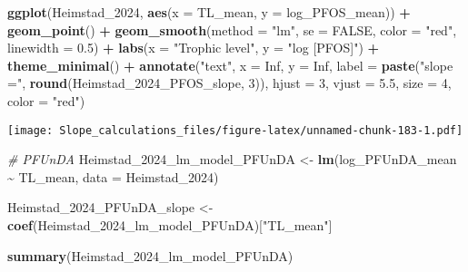 \documentclass[
]{article}
\newenvironment{Shaded}{\begin{snugshade}}{\end{snugshade}}
\newcommand{\AttributeTok}[1]{\textcolor[rgb]{0.13,0.29,0.53}{#1}}
\newcommand{\CommentTok}[1]{\textcolor[rgb]{0.56,0.35,0.01}{\textit{#1}}}
\newcommand{\ConstantTok}[1]{\textcolor[rgb]{0.56,0.35,0.01}{#1}}
\newcommand{\DecValTok}[1]{\textcolor[rgb]{0.00,0.00,0.81}{#1}}
\newcommand{\FloatTok}[1]{\textcolor[rgb]{0.00,0.00,0.81}{#1}}
\newcommand{\FunctionTok}[1]{\textcolor[rgb]{0.13,0.29,0.53}{\textbf{#1}}}
\newcommand{\NormalTok}[1]{#1}
\newcommand{\OtherTok}[1]{\textcolor[rgb]{0.56,0.35,0.01}{#1}}
\newcommand{\SpecialCharTok}[1]{\textcolor[rgb]{0.81,0.36,0.00}{\textbf{#1}}}
\newcommand{\StringTok}[1]{\textcolor[rgb]{0.31,0.60,0.02}{#1}}
\begin{document}
\begin{Shaded}
\begin{Highlighting}[]
\FunctionTok{ggplot}\NormalTok{(Heimstad\_2024, }\FunctionTok{aes}\NormalTok{(}\AttributeTok{x =}\NormalTok{ TL\_mean, }\AttributeTok{y =}\NormalTok{ log\_PFOS\_mean)) }\SpecialCharTok{+}
  \FunctionTok{geom\_point}\NormalTok{() }\SpecialCharTok{+}
  \FunctionTok{geom\_smooth}\NormalTok{(}\AttributeTok{method =} \StringTok{"lm"}\NormalTok{, }\AttributeTok{se =} \ConstantTok{FALSE}\NormalTok{, }\AttributeTok{color =} \StringTok{"red"}\NormalTok{, }\AttributeTok{linewidth =} \FloatTok{0.5}\NormalTok{) }\SpecialCharTok{+}
  \FunctionTok{labs}\NormalTok{(}\AttributeTok{x =} \StringTok{"Trophic level"}\NormalTok{,}
       \AttributeTok{y =} \StringTok{"log [PFOS]"}\NormalTok{) }\SpecialCharTok{+}
  \FunctionTok{theme\_minimal}\NormalTok{() }\SpecialCharTok{+}
  \FunctionTok{annotate}\NormalTok{(}\StringTok{"text"}\NormalTok{, }\AttributeTok{x =} \ConstantTok{Inf}\NormalTok{, }\AttributeTok{y =} \ConstantTok{Inf}\NormalTok{, }\AttributeTok{label =} \FunctionTok{paste}\NormalTok{(}\StringTok{"slope ="}\NormalTok{, }\FunctionTok{round}\NormalTok{(Heimstad\_2024\_PFOS\_slope, }\DecValTok{3}\NormalTok{)), }
           \AttributeTok{hjust =} \DecValTok{3}\NormalTok{, }\AttributeTok{vjust =} \FloatTok{5.5}\NormalTok{, }\AttributeTok{size =} \DecValTok{4}\NormalTok{, }\AttributeTok{color =} \StringTok{"red"}\NormalTok{)}
\end{Highlighting}
\end{Shaded}

\texttt{[image: Slope\_calculations\_files/figure-latex/unnamed-chunk-183-1.pdf]}

\begin{Shaded}
\begin{Highlighting}[]
\CommentTok{\# PFUnDA}
\NormalTok{Heimstad\_2024\_lm\_model\_PFUnDA }\OtherTok{\textless{}{-}} \FunctionTok{lm}\NormalTok{(log\_PFUnDA\_mean }\SpecialCharTok{\textasciitilde{}}\NormalTok{ TL\_mean,}
                                    \AttributeTok{data =}\NormalTok{ Heimstad\_2024)}

\NormalTok{Heimstad\_2024\_PFUnDA\_slope }\OtherTok{\textless{}{-}} \FunctionTok{coef}\NormalTok{(Heimstad\_2024\_lm\_model\_PFUnDA)[}\StringTok{"TL\_mean"}\NormalTok{]}

\FunctionTok{summary}\NormalTok{(Heimstad\_2024\_lm\_model\_PFUnDA)}
\end{Highlighting}
\end{Shaded}
\end{document}

